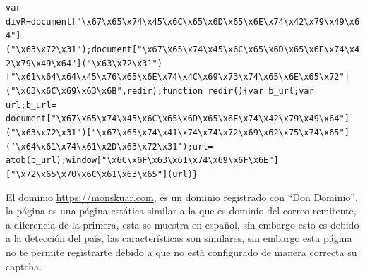 \documentclass[11pt]{article}
\begin{document}
\texttt{var divR=document["\textbackslash{}x67\textbackslash{}x65\textbackslash{}x74\textbackslash{}x45\textbackslash{}x6C\textbackslash{}x65\textbackslash{}x6D\textbackslash{}x65\textbackslash{}x6E\textbackslash{}x74\textbackslash{}x42\textbackslash{}x79\textbackslash{}x49\textbackslash{}x64"]("\textbackslash{}x63\textbackslash{}x72\textbackslash{}x31");document["\textbackslash{}x67\textbackslash{}x65\textbackslash{}x74\textbackslash{}x45\textbackslash{}x6C\textbackslash{}x65\textbackslash{}x6D\textbackslash{}x65\textbackslash{}x6E\textbackslash{}x74\textbackslash{}x42\textbackslash{}x79\textbackslash{}x49\textbackslash{}x64"]("\textbackslash{}x63\textbackslash{}x72\textbackslash{}x31")["\textbackslash{}x61\textbackslash{}x64\textbackslash{}x64\textbackslash{}x45\textbackslash{}x76\textbackslash{}x65\textbackslash{}x6E\textbackslash{}x74\textbackslash{}x4C\textbackslash{}x69\textbackslash{}x73\textbackslash{}x74\textbackslash{}x65\textbackslash{}x6E\textbackslash{}x65\textbackslash{}x72"]("\textbackslash{}x63\textbackslash{}x6C\textbackslash{}x69\textbackslash{}x63\textbackslash{}x6B",redir);function redir()\{var b\_url;var url;b\_url= document["\textbackslash{}x67\textbackslash{}x65\textbackslash{}x74\textbackslash{}x45\textbackslash{}x6C\textbackslash{}x65\textbackslash{}x6D\textbackslash{}x65\textbackslash{}x6E\textbackslash{}x74\textbackslash{}x42\textbackslash{}x79\textbackslash{}x49\textbackslash{}x64"]("\textbackslash{}x63\textbackslash{}x72\textbackslash{}x31")["\textbackslash{}x67\textbackslash{}x65\textbackslash{}x74\textbackslash{}x41\textbackslash{}x74\textbackslash{}x74\textbackslash{}x72\textbackslash{}x69\textbackslash{}x62\textbackslash{}x75\textbackslash{}x74\textbackslash{}x65"]('\textbackslash{}x64\textbackslash{}x61\textbackslash{}x74\textbackslash{}x61\textbackslash{}x2D\textbackslash{}x63\textbackslash{}x72\textbackslash{}x31');url= atob(b\_url);window["\textbackslash{}x6C\textbackslash{}x6F\textbackslash{}x63\textbackslash{}x61\textbackslash{}x74\textbackslash{}x69\textbackslash{}x6F\textbackslash{}x6E"]["\textbackslash{}x72\textbackslash{}x65\textbackslash{}x70\textbackslash{}x6C\textbackslash{}x61\textbackslash{}x63\textbackslash{}x65"](url)\}}

El dominio \url{https://monskuar.com}, es un dominio registrado con ``Don Dominio'', la página es una página estática similar a la que es dominio del correo remitente, a diferencia de la primera, esta se muestra en español, sin embargo esto es debido a la detección del país, las características son similares, sin embargo esta página no te permite registrarte debido a que no está configurado de manera correcta su captcha.
\end{document}
